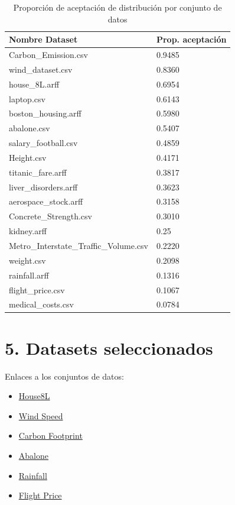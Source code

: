 \begin{table}[h]
\centering
    \caption{Proporción de aceptación de distribución por conjunto de datos}
\begin{tabularx}{\textwidth}{l X}
\toprule
\textbf{Nombre Dataset} & \textbf{Prop. aceptación} \\
\midrule
Carbon\_Emission.csv & 0.9485 \\
wind\_dataset.csv & 0.8360 \\
house\_8L.arff & 0.6954 \\
laptop.csv & 0.6143 \\
boston\_housing.arff & 0.5980 \\
abalone.csv & 0.5407 \\
salary\_football.csv & 0.4859 \\
Height.csv & 0.4171 \\
titanic\_fare.arff & 0.3817 \\
liver\_disorders.arff & 0.3623 \\
aerospace\_stock.arff & 0.3158 \\
Concrete\_Strength.csv & 0.3010 \\
kidney.arff & 0.25 \\
Metro\_Interstate\_Traffic\_Volume.csv & 0.2220 \\
weight.csv & 0.2098 \\
rainfall.arff & 0.1316 \\
flight\_price.csv & 0.1067 \\
medical\_costs.csv & 0.0784 \\
\bottomrule
\end{tabularx}
\end{table}

\FloatBarrier

\section*{5. Datasets seleccionados}
\label{appendix5}

Enlaces a los conjuntos de datos:

\begin{itemize}
    \item \href{https://www.openml.org/search?type=data&status=active&id=218}{House8L}
    \item \href{https://www.kaggle.com/datasets/fedesoriano/wind-speed-prediction-dataset}{Wind Speed}
    \item \href{https://www.kaggle.com/datasets/dumanmesut/individual-carbon-footprint-calculation}{Carbon Footprint}
    \item \href{https://www.kaggle.com/datasets/rodolfomendes/abalone-dataset}{Abalone}
    \item \href{https://www.openml.org/search?type=data&status=active&id=41539}{Rainfall}
    \item \href{https://www.kaggle.com/datasets/viveksharmar/flight-price-data}{Flight Price}
\end{itemize}

